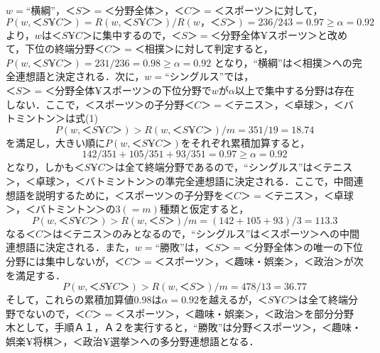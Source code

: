 $w=\mbox{``横綱''}$，$＜S＞=＜分野全体＞$，$＜C＞=＜スポーツ＞$に対して，
\[
P(w,＜S¥C＞)=R(w,＜S¥C＞)/R(w，＜S＞)=236/243=0.97\ge \alpha =0.92
\]
より，$w$は$＜S¥C＞$に集中するので，$＜S＞=＜分野全体¥スポーツ＞$と改めて，下位の終端分野$＜C＞=＜相撲＞$に対して判定すると，$P(w,＜S¥C＞)=231/236=0.98\ge \alpha =0.92$
となり，``横綱''は＜相撲＞への完全連想語と決定される．次に，$w=\mbox{``シングルス''}$では，$＜S＞=＜分野全体¥スポーツ＞$の下位分野で$w$が$\alpha$以上で集中す\mbox{る分野は存在しない．ここ}で，＜スポーツ＞の子分野$＜C＞=＜テニス＞$，＜卓球＞，＜バトミントン＞は式(1)
\[
P(w,＜S¥C＞)>R(w,＜S¥C＞)/m=351/19=18.74
\]
を満足し，大きい順に$P(w,＜S¥C＞)$をそれぞれ累積加算すると，
\[
142/351+105/351+93/351=0.97\ge \alpha =0.92
\]
となり，しかも$＜S¥C＞$は全て終端分野であるので，``シングルス''は＜テニス＞，\mbox{＜卓球＞，}＜バトミントン＞の準完全連想語に決定される．ここで，中間連想語を説明するために，＜スポーツ＞の子分野を$＜C＞=＜テニス＞$，＜卓球＞，＜バトミントン＞の$3(=m)$\mbox{種類と仮定}すると，
\[
P(w,＜S¥C＞)>R(w,＜S＞)/m=(142+105+93)/3=113.3
\]
なる$＜C＞$は＜テニス＞のみとなるので，``シングルス''は＜スポーツ＞への中間連想\mbox{語に決定}される．また，$w=\mbox{``勝敗''}$は，$＜S＞=＜分野全体＞$の唯一の下位分野には集中しないが，$＜C＞=＜スポーツ＞$，＜趣味・娯楽＞，＜政治＞が次を満足する．
\[
P(w,＜S¥C＞)>R(w,＜S＞)/m=478/13=36.77
\]
そして，これらの累積加算値0.98は$\alpha=0.92$を越えるが，$＜S¥C＞$は全て終端分野で\mbox{ないの}で，$＜C＞=＜スポーツ＞$，＜趣味・娯楽＞，＜政治＞を部分分野木として，手順Ａ１，Ａ２を実行すると，``勝敗''は分野＜スポーツ＞，＜趣味・娯楽¥将棋＞，＜政治¥選挙＞への多分野連想語となる．
\vspace{-3mm}
